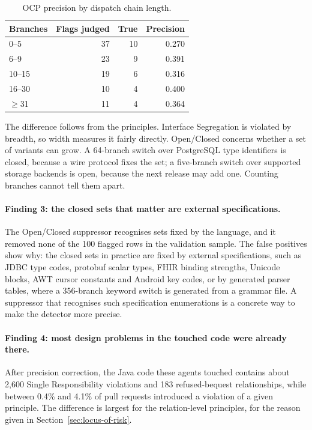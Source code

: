 \begin{table}[htb]
\centering
\caption{OCP precision by dispatch chain length.}
\label{tab:ocp-width}
\begin{tabular}{@{}lrrr@{}}
\toprule
\textbf{Branches} & \textbf{Flags judged} & \textbf{True} & \textbf{Precision} \\
\midrule
0--5     & 37 & 10 & 0.270 \\
6--9     & 23 &  9 & 0.391 \\
10--15   & 19 &  6 & 0.316 \\
16--30   & 10 &  4 & 0.400 \\
$\geq$31 & 11 &  4 & 0.364 \\
\bottomrule
\end{tabular}
\end{table}

The difference follows from the principles. Interface Segregation is violated by breadth, so width
measures it fairly directly. Open/Closed concerns whether a set of variants can grow. A 64-branch
switch over PostgreSQL type identifiers is closed, because a wire protocol fixes the set; a
five-branch switch over supported storage backends is open, because the next release may add one.
Counting branches cannot tell them apart.

\paragraph{Finding 3: the closed sets that matter are external specifications.} The Open/Closed
suppressor recognises sets fixed by the language, and it removed none of the 100 flagged rows in the
validation sample. The false positives show why: the closed sets in practice are fixed by external
specifications, such as JDBC type codes, protobuf scalar types, FHIR binding strengths, Unicode
blocks, AWT cursor constants and Android key codes, or by generated parser tables, where a 356-branch
keyword switch is generated from a grammar file. A suppressor that recognises such specification
enumerations is a concrete way to make the detector more precise.

\paragraph{Finding 4: most design problems in the touched code were already there.} After precision
correction, the Java code these agents touched contains about 2,600 Single Responsibility violations
and 183 refused-bequest relationships, while between 0.4\% and 4.1\% of pull requests introduced a
violation of a given principle. The difference is largest for the relation-level principles, for the
reason given in Section~\ref{sec:locus-of-risk}.


